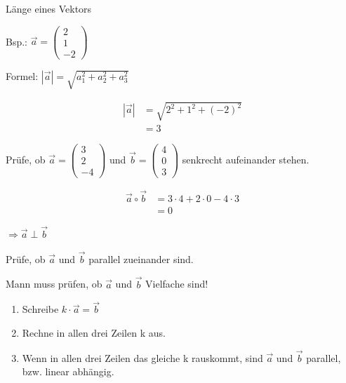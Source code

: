 \begin{frage}Länge eines Vektors
	
	Bsp.: $\vec{a}=\left(\begin{array}{c} 2 \\ 1 \\ -2\end{array} \right)$\end{frage}
\begin{antwort}Formel: $\left|\vec{a}\right|=\sqrt{a_1^2 + a_2^2 + a_3^2}$
	
	\bigskip		
	\begin{align*}
	\left|\vec{a}\right|&=\sqrt{2^2 + 1^2 + (-2)^2} \\
	&=3
	\end{align*}\end{antwort}
\begin{frage}\LARGE
	Prüfe, ob $\vec{a}=\left(\begin{array}{c} 3 \\ 2 \\ -4\end{array} \right)$ und  $\vec{b}=\left(\begin{array}{c} 4 \\ 0 \\ 3\end{array} \right)$ 
	senkrecht aufeinander stehen.\end{frage}
\begin{antwort}\begin{align*}
	\vec{a} \circ \vec{b} &= 3 \cdot 4 + 2 \cdot 0 -4\cdot 3 \\
	&= 0
	\end{align*}
	
	$\Rightarrow \vec{a} \perp \vec{b}$\end{antwort}
\begin{frage}\LARGE
	Prüfe, ob $\vec{a}$ und  $\vec{b}$ 
	parallel zueinander sind.\end{frage}
\begin{antwort}Mann muss prüfen, ob $\vec{a}$ und  $\vec{b}$ Vielfache sind!
	\begin{enumerate}
		\item Schreibe $k \cdot \vec{a}= \vec{b}$
		\item Rechne in allen drei Zeilen k aus.			
		\item Wenn in allen drei Zeilen das gleiche k rauskommt, sind $\vec{a}$ und $\vec{b}$ parallel, bzw. linear abhängig.	
	\end{enumerate}\end{antwort}
